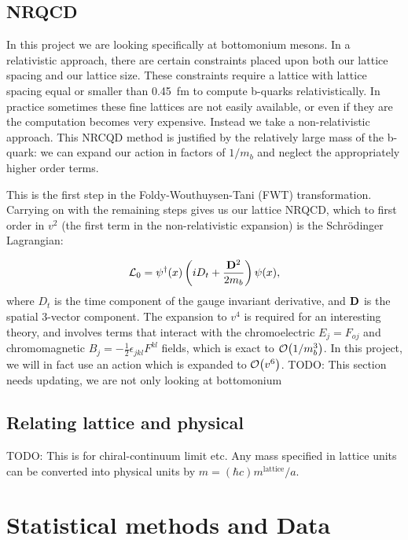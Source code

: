 \documentclass[a4paper,12pt]{article}
\begin{document}
\subsection{NRQCD}
In this project we are looking specifically at bottomonium mesons. In a relativistic approach, there are certain constraints placed upon both our lattice spacing and our lattice size. These constraints require a lattice with lattice spacing equal or smaller than \SI{0.45}{fm} to compute b-quarks relativistically\cite{2015Colquhoun}. In practice sometimes these fine lattices are not easily available, or even if they are the computation becomes very expensive. Instead we take a non-relativistic approach. This NRCQD method is justified by the relatively large mass of the b-quark: we can expand our action in factors of $1/m_b$ and neglect the appropriately higher order terms.

This is the first step in the Foldy-Wouthuysen-Tani (FWT) transformation. Carrying on with the remaining steps gives us our lattice NRQCD, which to first order in $v^2$ (the first term in the non-relativistic expansion) is the Schrödinger Lagrangian:

\begin{equation}
    \label{eq:NRQCDS0}
    \mathcal{L}_0 = \psi^\dagger(x)\left(i D_t + \frac{\vb{D}^2}{2m_b}\right)\psi(x),
\end{equation}
where $D_t$ is the time component of the gauge invariant derivative, and $\vb{D}$ is the spatial 3-vector component. The expansion to $v^4$ is required for an interesting theory, and involves terms that interact\cite{2010Meinel} with the chromoelectric $E_j = F_{oj}$ and chromomagnetic $B_j = -\frac{1}{2}\epsilon_{jkl}F^{kl}$ fields, which is exact to $\order{1/m_b^3}$. In this project, we will in fact use an action which is expanded to $\order{v^6}$.
TODO: This section needs updating, we are not only looking at bottomonium

\subsection{Relating lattice and physical}
TODO: This is for chiral-continuum limit etc.
Any mass specified in lattice units can be converted into physical units by $m = (\hbar c) m^\mathrm{lattice} / a$.

\section{Statistical methods and Data}
\end{document}
